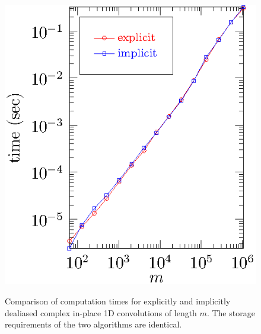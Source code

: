 \documentclass[final]{siamltex}
\begin{document}
\begin{figure}[htbp]
\begin{minipage}{0.49\linewidth}
\begin{center}
\includegraphics{timing1c}
\caption{Comparison of computation times for explicitly and implicitly
dealiased complex in-place 1D convolutions of length $m$. The storage
requirements of the two algorithms are identical.}
\label{timing1c}
\end{center}
\end{minipage}
\begin{minipage}{0.49\linewidth}
\begin{center}

\end{center}
\end{minipage}
\end{figure}
\end{document}
